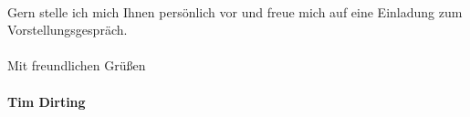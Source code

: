 \documentclass[12pt,twoside,a4paper]{scrlttr2}
\begin{document}
\begin{letter}
\begin{flushleft}
			\,\\
			Gern stelle ich mich Ihnen persönlich vor und freue mich auf eine Einladung zum Vorstellungsgespräch.\\
			\, \\
			Mit freundlichen Grüßen\\
			
			\textbf{\\Tim Dirting}		
	
			\end{flushleft}
			
		
		\begin{onehalfspace}
		
			
		\end{onehalfspace}
		
		
	\end{letter}
	
\end{document}
